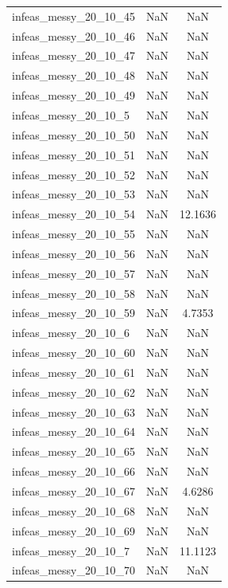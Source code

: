 \begin{longtable}{lcc}
infeas\_messy\_20\_10\_45  &      NaN &     NaN \\
infeas\_messy\_20\_10\_46  &      NaN &     NaN \\
infeas\_messy\_20\_10\_47  &      NaN &     NaN \\
infeas\_messy\_20\_10\_48  &      NaN &     NaN \\
infeas\_messy\_20\_10\_49  &      NaN &     NaN \\
infeas\_messy\_20\_10\_5   &      NaN &     NaN \\
infeas\_messy\_20\_10\_50  &      NaN &     NaN \\
infeas\_messy\_20\_10\_51  &      NaN &     NaN \\
infeas\_messy\_20\_10\_52  &      NaN &     NaN \\
infeas\_messy\_20\_10\_53  &      NaN &     NaN \\
infeas\_messy\_20\_10\_54  &      NaN & 12.1636 \\
infeas\_messy\_20\_10\_55  &      NaN &     NaN \\
infeas\_messy\_20\_10\_56  &      NaN &     NaN \\
infeas\_messy\_20\_10\_57  &      NaN &     NaN \\
infeas\_messy\_20\_10\_58  &      NaN &     NaN \\
infeas\_messy\_20\_10\_59  &      NaN &  4.7353 \\
infeas\_messy\_20\_10\_6   &      NaN &     NaN \\
infeas\_messy\_20\_10\_60  &      NaN &     NaN \\
infeas\_messy\_20\_10\_61  &      NaN &     NaN \\
infeas\_messy\_20\_10\_62  &      NaN &     NaN \\
infeas\_messy\_20\_10\_63  &      NaN &     NaN \\
infeas\_messy\_20\_10\_64  &      NaN &     NaN \\
infeas\_messy\_20\_10\_65  &      NaN &     NaN \\
infeas\_messy\_20\_10\_66  &      NaN &     NaN \\
infeas\_messy\_20\_10\_67  &      NaN &  4.6286 \\
infeas\_messy\_20\_10\_68  &      NaN &     NaN \\
infeas\_messy\_20\_10\_69  &      NaN &     NaN \\
infeas\_messy\_20\_10\_7   &      NaN & 11.1123 \\
infeas\_messy\_20\_10\_70  &      NaN &     NaN \\

\end{longtable}

